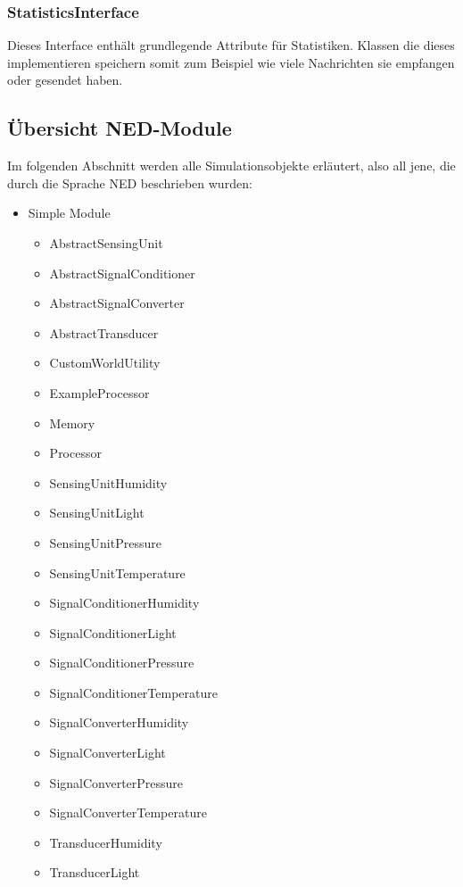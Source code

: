 \subsubsection{StatisticsInterface}

Dieses Interface enthält grundlegende Attribute für Statistiken. Klassen die dieses implementieren speichern somit zum Beispiel wie viele Nachrichten sie empfangen oder gesendet haben.

\subsection{Übersicht NED-Module}

Im folgenden Abschnitt werden alle Simulationsobjekte erläutert, also all jene, die durch die Sprache NED beschrieben wurden:

\begin{minipage}{\textwidth}
\begin{itemize}{\label{enum:NedModules}}
\item Simple Module
\begin{multicols}{2}
\begin{itemize}
\item AbstractSensingUnit
\item AbstractSignalConditioner
\item AbstractSignalConverter
\item AbstractTransducer
\item CustomWorldUtility
\item ExampleProcessor
\item Memory
\item Processor
\item SensingUnitHumidity
\item SensingUnitLight
\item SensingUnitPressure
\item SensingUnitTemperature
\item SignalConditionerHumidity
\item SignalConditionerLight
\item SignalConditionerPressure
\item SignalConditionerTemperature
\item SignalConverterHumidity
\item SignalConverterLight
\item SignalConverterPressure
\item SignalConverterTemperature
\item TransducerHumidity
\item TransducerLight

\end{itemize}
\end{multicols}
\end{itemize}
\end{minipage}
